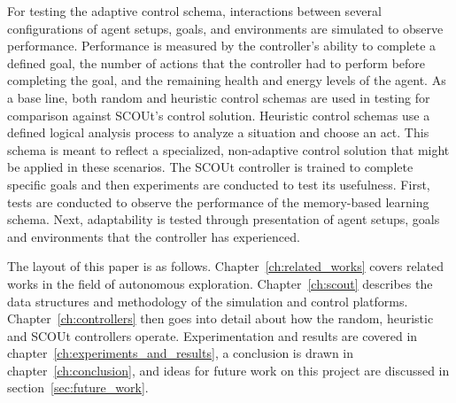 For testing the adaptive control schema, interactions between several configurations of agent setups, goals, and environments are simulated to observe performance.
Performance is measured by the controller's ability to complete a defined goal, the number of actions that the controller had to perform before completing the goal, and the remaining health and energy levels of the agent.
As a base line, both random and heuristic control schemas are used in testing for comparison against SCOUt's control solution.
Heuristic control schemas use a defined logical analysis process to analyze a situation and choose an act.
This schema is meant to reflect a specialized, non-adaptive control solution that might be applied in these scenarios.
The SCOUt controller is trained to complete specific goals and then experiments are conducted to test its usefulness.
First, tests are conducted to observe the performance of the memory-based learning schema.
Next, adaptability is tested through presentation of agent setups, goals and environments that the controller has experienced.

The layout of this paper is as follows.
Chapter~\ref{ch:related_works} covers related works in the field of autonomous exploration.
Chapter~\ref{ch:scout} describes the data structures and methodology of the simulation and control platforms.
Chapter~\ref{ch:controllers} then goes into detail about how the random, heuristic and SCOUt controllers operate.
Experimentation and results are covered in chapter~\ref{ch:experiments_and_results}, a conclusion is drawn in chapter~\ref{ch:conclusion}, and ideas for future work on this project are discussed in section~\ref{sec:future_work}.
